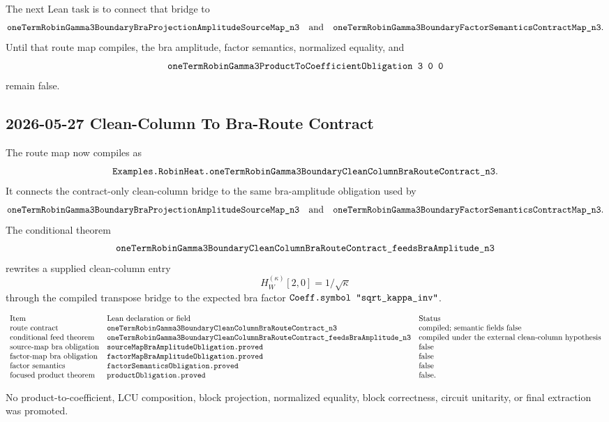 The next Lean task is to connect that bridge to
\[
  \texttt{oneTermRobinGamma3BoundaryBraProjectionAmplitudeSourceMap\_n3}
  \quad\text{and}\quad
  \texttt{oneTermRobinGamma3BoundaryFactorSemanticsContractMap\_n3}.
\]
Until that route map compiles, the bra amplitude, factor semantics, normalized
equality, and
\[
  \Lean{oneTermRobinGamma3ProductToCoefficientObligation\ 3\ 0\ 0}
\]
remain false.

\subsection{2026-05-27 Clean-Column To Bra-Route Contract}

The route map now compiles as
\[
  \texttt{Examples.RobinHeat.oneTermRobinGamma3BoundaryCleanColumnBraRouteContract\_n3}.
\]
It connects the contract-only clean-column bridge to the same bra-amplitude
obligation used by
\[
  \texttt{oneTermRobinGamma3BoundaryBraProjectionAmplitudeSourceMap\_n3}
  \quad\text{and}\quad
  \texttt{oneTermRobinGamma3BoundaryFactorSemanticsContractMap\_n3}.
\]
The conditional theorem
\[
  \texttt{oneTermRobinGamma3BoundaryCleanColumnBraRouteContract\_feedsBraAmplitude\_n3}
\]
rewrites a supplied clean-column entry
\[
  H_W^{(\kappa)}[2,0] = 1/\sqrt{\kappa}
\]
through the compiled transpose bridge to the expected bra factor
\(\Lean{Coeff.symbol\ "sqrt\_kappa\_inv"}\).

\[
\begin{array}{lll}
\text{Item} & \text{Lean declaration or field} & \text{Status}\\
\text{route contract} &
\texttt{oneTermRobinGamma3BoundaryCleanColumnBraRouteContract\_n3} &
\text{compiled; semantic fields false}\\
\text{conditional feed theorem} &
\texttt{oneTermRobinGamma3BoundaryCleanColumnBraRouteContract\_feedsBraAmplitude\_n3} &
\text{compiled under the external clean-column hypothesis}\\
\text{source-map bra obligation} &
\texttt{sourceMapBraAmplitudeObligation.proved} & \text{false}\\
\text{factor-map bra obligation} &
\texttt{factorMapBraAmplitudeObligation.proved} & \text{false}\\
\text{factor semantics} &
\texttt{factorSemanticsObligation.proved} & \text{false}\\
\text{focused product theorem} &
\texttt{productObligation.proved} & \text{false}.
\end{array}
\]

No product-to-coefficient, LCU composition, block projection, normalized
equality, block correctness, circuit unitarity, or final extraction was
promoted.

